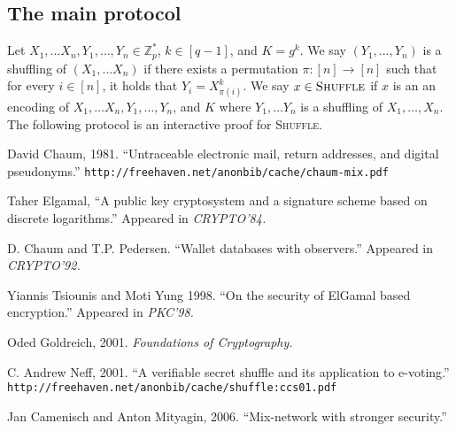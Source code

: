 \documentclass[letter]{article}
\newcommand{\Zmodp}{\mathbb{Z}_p}
\begin{document}
\subsection{The main protocol} \label{sec-general-n-shuffle}
Let $X_1, \dots X_n, Y_1, \dots, Y_n \in \Zmodp^*$, $k \in [q-1]$, and $K =
g^k$. We say $(Y_1, \dots, Y_n)$ is a shuffling of $(X_1, \dots X_n)$ if there
exists a permutation $\pi : [n] \to [n]$ such that for every $i \in [n]$, it
holds that $Y_i = X_{\pi(i)}^k$. We say $x \in \textsc{Shuffle}$ if $x$ is an
an encoding of $X_1, \dots X_n, Y_1, \dots, Y_n$, and $K$ where $Y_1, \dots Y_n$ is a
shuffling of $X_1, \dots, X_n$. The following protocol is an interactive proof
for \textsc{Shuffle}.

\begin{thebibliography}{99}

   David Chaum, 1981. ``Untraceable electronic mail, return addresses, and digital pseudonyms.''
    {\tt http://freehaven.net/anonbib/cache/chaum-mix.pdf}

   Taher Elgamal, ``A public key cryptosystem and a signature
    scheme based on discrete logarithms.'' Appeared in \textit{CRYPTO'84.}

    D. Chaum and T.P. Pedersen. ``Wallet databases with
    observers.'' Appeared in \textit{CRYPTO'92.}

   Yiannis Tsiounis and Moti Yung 1998. ``On the security of
    ElGamal based encryption.'' Appeared in \textit{PKC'98.}

   Oded Goldreich, 2001. \textit{Foundations of Cryptography.}

   C. Andrew Neff, 2001. ``A verifiable secret shuffle and its application to e-voting.'' {\tt http://freehaven.net/anonbib/cache/shuffle:ccs01.pdf}

   Jan Camenisch and Anton Mityagin, 2006. ``Mix-network with
    stronger security.''

\end{thebibliography}
\end{document}
